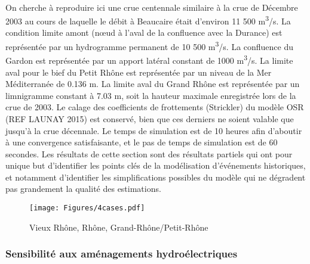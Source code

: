 \documentclass[11pt]{article}
\begin{document}
	\paragraph{} On cherche à reproduire ici une crue centennale similaire à la crue de Décembre 2003 au cours de laquelle le débit à Beaucaire était d'environ 11 500 m\textsuperscript{3}/s. La condition limite amont (nœud à l'aval de la confluence avec la Durance) est représentée par un hydrogramme permanent de 10 500 m\textsuperscript{3}/s. La confluence du Gardon est représentée par un apport latéral constant de 1000 m\textsuperscript{3}/s. La limite aval pour le bief du Petit Rhône est représentée par un niveau de la Mer Méditerranée de 0.136 m. La limite aval du Grand Rhône est représentée par un limnigramme constant à 7.03 m, soit la hauteur maximale enregistrée lors de la crue de 2003. Le calage des coefficients de frottements (Strickler) du modèle OSR (REF LAUNAY 2015) est conservé, bien que ces derniers ne soient valable que jusqu'à la crue décennale. Le temps de simulation est de 10 heures afin d'aboutir à une convergence satisfaisante, et le pas de temps de simulation est de 60 secondes. Les résultats de cette section sont des résultats partiels qui ont pour unique but d'identifier les points clés de la modélisation d'événements historiques, et notamment d'identifier les simplifications possibles du modèle qui ne dégradent pas grandement la qualité des estimations.
	
	\begin{figure}[h]
		\centering
		\texttt{[image: Figures/4cases.pdf]}
        \caption{Vieux Rhône, Rhône, Grand-Rhône/Petit-Rhône}
		\label{fig:Sensib4}
	\end{figure}		
			
	
	\subsubsection{Sensibilité aux aménagements hydroélectriques}
	
\end{document}
